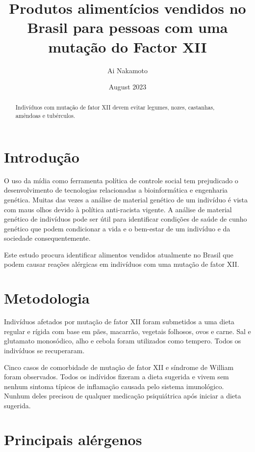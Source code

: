 \documentclass{article}
\begin{document}
\title{Produtos alimentícios vendidos no Brasil para pessoas com uma mutação do Factor XII}
\author{Ai Nakamoto}
\date{August 2023}
\maketitle

\begin{abstract}
Indivíduos com mutação de fator XII devem evitar
legumes, nozes, castanhas, amêndoas e tubérculos.
\end{abstract}

\section{Introdução}

O uso da mídia como ferramenta política de controle social
tem prejudicado o desenvolvimento de tecnologias relacionadas
a bioinformática e engenharia genética. Muitas das vezes
a análise de material genético de um indivíduo é vista com
maus olhos devido à política anti-racista vigente.
A análise de material genético de indivíduos pode ser útil
para identificar condições de saúde de cunho genético que
podem condicionar a vida e o bem-estar de um indivíduo e
da sociedade consequentemente.

Este estudo procura identificar alimentos vendidos atualmente
no Brasil que podem causar reações alérgicas em indivíduos com
uma mutação de fator XII.

\section{Metodologia}

Indivíduos afetados por mutação de fator XII foram submetidos a uma dieta
regular e rígida com base em pães, macarrão, vegetais folhosos, ovos e carne. Sal e glutamato
monosódico, alho e cebola foram utilizados como tempero. Todos os indivíduos
se recuperaram.

Cinco casos de comorbidade de mutação de fator XII e síndrome de William
foram observados. Todos os indívidos fizeram a dieta sugerida e vivem sem
nenhum sintoma típicos de inflamação causada pelo sistema imunológico.
Nunhum deles precisou de qualquer medicação psiquiátrica após iniciar a
dieta sugerida.

\section{Principais alérgenos}
\end{document}
